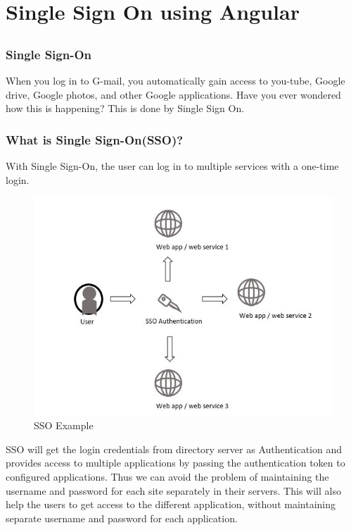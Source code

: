 \documentclass{report}
\begin{document}
\chapter{Single Sign On using Angular}
\section{}
\subsection*{Single Sign-On}
When you log in to G-mail, you automatically gain access to you-tube, Google drive, Google photos, and other Google applications. Have you ever wondered how this is happening?
This is done by Single Sign On.

\subsection*{What is Single Sign-On(SSO)?}
With Single Sign-On, the user can log in to multiple services with a one-time login.
\begin{figure}[h]
	\centerline{\includegraphics{newwhatissso.jpg}}
	\caption{SSO Example}
	\label{SSO Example}
\end{figure}
SSO will get the login credentials from directory server as Authentication and provides access to multiple applications by passing the authentication token to configured applications. Thus we can avoid the problem of maintaining the username and password for each site separately in their servers.
This will also help the users to get access to the different application, without maintaining separate username and password for each application.
\end{document}
